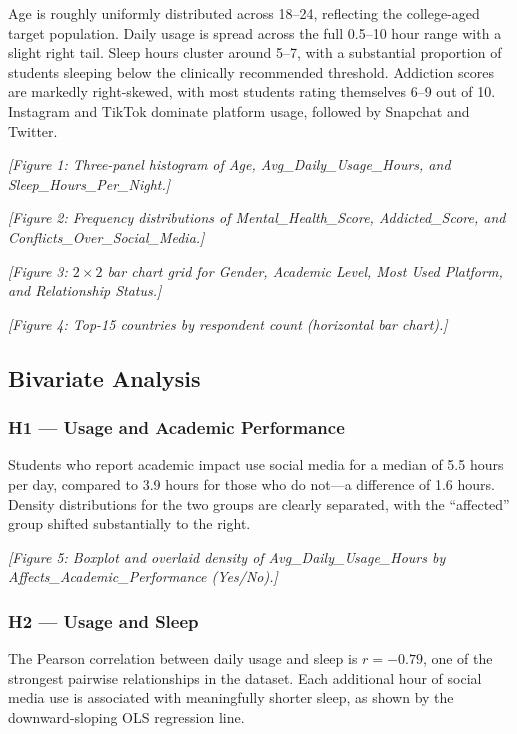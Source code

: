 \documentclass[10pt]{article}
\begin{document}
Age is roughly uniformly distributed across 18--24, reflecting the
college-aged target population. Daily usage is spread across the full 0.5--10
hour range with a slight right tail. Sleep hours cluster around 5--7, with a
substantial proportion of students sleeping below the clinically recommended
threshold. Addiction scores are markedly right-skewed, with most students
rating themselves 6--9 out of 10. Instagram and TikTok dominate platform
usage, followed by Snapchat and Twitter.


\textit{[Figure 1: Three-panel histogram of Age, Avg\_Daily\_Usage\_Hours, and
Sleep\_Hours\_Per\_Night.]}

\textit{[Figure 2: Frequency distributions of Mental\_Health\_Score,
Addicted\_Score, and Conflicts\_Over\_Social\_Media.]}

\textit{[Figure 3: $2\times2$ bar chart grid for Gender, Academic Level,
Most Used Platform, and Relationship Status.]}

\textit{[Figure 4: Top-15 countries by respondent count (horizontal bar
chart).]}

\subsection{Bivariate Analysis}

\subsubsection{H1 --- Usage and Academic Performance}

Students who report academic impact use social media for a median of 5.5 hours
per day, compared to 3.9 hours for those who do not---a difference of 1.6
hours. Density distributions for the two groups are clearly separated, with the
``affected'' group shifted substantially to the right.

\textit{[Figure 5: Boxplot and overlaid density of Avg\_Daily\_Usage\_Hours by
Affects\_Academic\_Performance (Yes/No).]}

\subsubsection{H2 --- Usage and Sleep}

The Pearson correlation between daily usage and sleep is $r = -0.79$, one of
the strongest pairwise relationships in the dataset. Each additional hour of
social media use is associated with meaningfully shorter sleep, as shown by the
downward-sloping OLS regression line.
\end{document}
